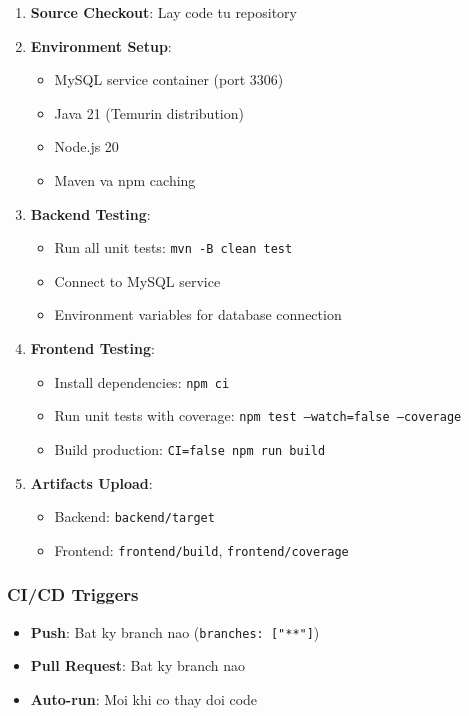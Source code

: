 \begin{enumerate}
    \item \textbf{Source Checkout}: Lay code tu repository
    \item \textbf{Environment Setup}:
    \begin{itemize}
        \item MySQL service container (port 3306)
        \item Java 21 (Temurin distribution)
        \item Node.js 20
        \item Maven va npm caching
    \end{itemize}
    \item \textbf{Backend Testing}:
    \begin{itemize}
        \item Run all unit tests: \texttt{mvn -B clean test}
        \item Connect to MySQL service
        \item Environment variables for database connection
    \end{itemize}
    \item \textbf{Frontend Testing}:
    \begin{itemize}
        \item Install dependencies: \texttt{npm ci}
        \item Run unit tests with coverage: \texttt{npm test --watch=false --coverage}
        \item Build production: \texttt{CI=false npm run build}
    \end{itemize}
    \item \textbf{Artifacts Upload}:
    \begin{itemize}
        \item Backend: \texttt{backend/target}
        \item Frontend: \texttt{frontend/build}, \texttt{frontend/coverage}
    \end{itemize}
\end{enumerate}

\subsubsection{CI/CD Triggers}

\begin{itemize}
    \item \textbf{Push}: Bat ky branch nao (\texttt{branches: ["**"]})
    \item \textbf{Pull Request}: Bat ky branch nao
    \item \textbf{Auto-run}: Moi khi co thay doi code
\end{itemize}

